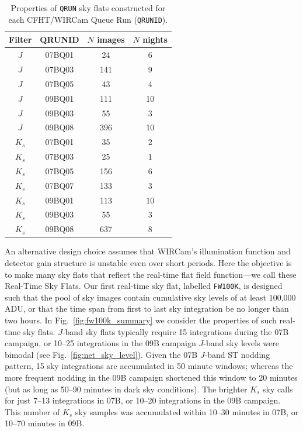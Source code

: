 \documentclass[iop]{emulateapj}
\newcommand{\Fig}[1]{Fig.~\ref{fig:#1}}  %
\begin{document}
\begin{table}[t]
\centering
\caption{Properties of \texttt{QRUN} sky flats constructed for each CFHT/WIRCam Queue Run (\texttt{QRUNID}).}
\label{tab:qrunflattable}

\begin{tabular}{cccc}
\hline
Filter & QRUNID & $N$ images & $N$ nights \\
\hline
$J$ & 07BQ01 & 24 & 6 \\
$J$ & 07BQ03 & 141 & 9 \\
$J$ & 07BQ05 & 43 & 4 \\
$J$ & 09BQ01 & 111 & 10 \\
$J$ & 09BQ03 & 55 & 3 \\
$J$ & 09BQ08 & 396 & 10 \\
\hline
$K_s$ & 07BQ01 & 35 & 2 \\
$K_s$ & 07BQ03 & 25 & 1 \\
$K_s$ & 07BQ05 & 156 & 6 \\
$K_s$ & 07BQ07 & 133 & 3 \\
$K_s$ & 09BQ01 & 113 & 10 \\
$K_s$ & 09BQ03 & 55 & 3 \\
$K_s$ & 09BQ08 & 637 & 8 \\
\hline
\end{tabular}
\end{table}

An alternative design choice assumes that WIRCam's illumination function and detector gain structure is unstable even over short periods.
Here the objective is to make many sky flats that reflect the real-time flat field function---we call these Real-Time Sky Flats.
Our first real-time sky flat, labelled \texttt{FW100K}, is designed such that the pool of sky images contain cumulative sky levels of at least 100,000 ADU, or that the time span from first to last sky integration be no longer than two hours.
In \Fig{fw100k_summary} we consider the properties of such real-time sky flats.
$J$-band sky flats typically require 15 integrations during the 07B campaign, or 10--25 integrations in the 09B campaign $J$-band sky levels were bimodal (see \Fig{net_sky_level}).
Given the 07B $J$-band ST nodding pattern, 15 sky integrations are accumulated in 50 minute windows; whereas the more frequent nodding in the 09B campaign shortened this window to 20 minutes (but as long as 50--90 minutes in dark sky conditions).
The brighter $K_s$ sky calls for just 7--13 integrations in 07B, or 10--20 integrations in the 09B campaign.
This number of $K_s$ sky samples was accumulated within 10--30 minutes in 07B, or 10--70 minutes in 09B.
\end{document}
